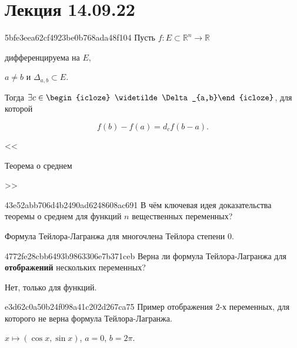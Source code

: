 \section{Лекция 14.09.22}
\begin{note}{5bfe3eea62cf4923be0b768ada48f104}
    Пусть \({ f : E \subset \mathbb R^{n} \to \mathbb R }\) \begin{icloze}{5}дифференцируема на \({ E }\),\end{icloze} \begin{icloze}{4}\({ a \neq b }\) и \({ \Delta_{a,b} \subset E }\).\end{icloze}
    Тогда \({ \exists c \in \begin{icloze}{2}\widetilde\Delta_{a,b}\end{icloze} }\), для которой
    \begin{icloze}{1}
        \[
            f(b) - f(a) = d_{c}f(b - a).
        \]
    \end{icloze}

    \begin{center}
        \tiny
        <<\begin{icloze}{3}Теорема о среднем\end{icloze}>>
    \end{center}
\end{note}

\begin{note}{43e52abb706d4b2490ad6248608ac691}
    В чём ключевая идея доказательства теоремы о среднем для функций \({ n }\) вещественных переменных?

    \begin{cloze}{1}
        Формула Тейлора-Лагранжа для многочлена Тейлора степени \({ 0 }\).
    \end{cloze}
\end{note}

\begin{note}{4772fe28cbb6493b9863306e7b371ceb}
    Верна ли формула Тейлора-Лагранжа для \textbf{отображений} нескольких переменных?

    \begin{cloze}{1}
        Нет, только для функций.
    \end{cloze}
\end{note}

\begin{note}{e3d62c0a50b24f098a41c202d267ca75}
    Пример отображения \({ 2 }\)-х переменных, для которого не верна формула Тейлора-Лагранжа.

    \begin{cloze}{1}
        \({ x \mapsto (\cos x, \sin x) }\),\: \({ a = 0 }\),\: \({ b = 2\pi }\).
    \end{cloze}
\end{note}

